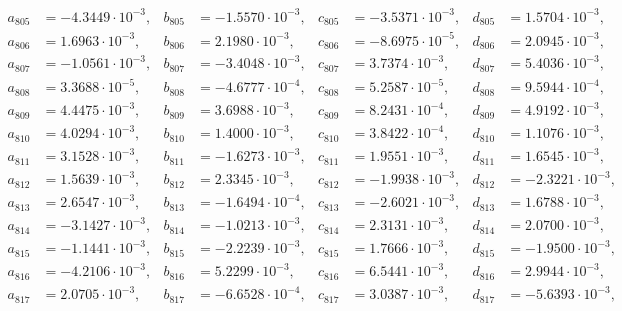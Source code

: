 \begin{align*}
  a_{ 805 } &= -4.3449 \cdot 10^{ -3 }, & b_{ 805 } &= -1.5570 \cdot 10^{ -3 }, & c_{ 805 } &= -3.5371 \cdot 10^{ -3 }, & d_{ 805 } &= 1.5704 \cdot 10^{ -3 }, \\ 
  a_{ 806 } &= 1.6963 \cdot 10^{ -3 }, & b_{ 806 } &= 2.1980 \cdot 10^{ -3 }, & c_{ 806 } &= -8.6975 \cdot 10^{ -5 }, & d_{ 806 } &= 2.0945 \cdot 10^{ -3 }, \\ 
  a_{ 807 } &= -1.0561 \cdot 10^{ -3 }, & b_{ 807 } &= -3.4048 \cdot 10^{ -3 }, & c_{ 807 } &= 3.7374 \cdot 10^{ -3 }, & d_{ 807 } &= 5.4036 \cdot 10^{ -3 }, \\ 
  a_{ 808 } &= 3.3688 \cdot 10^{ -5 }, & b_{ 808 } &= -4.6777 \cdot 10^{ -4 }, & c_{ 808 } &= 5.2587 \cdot 10^{ -5 }, & d_{ 808 } &= 9.5944 \cdot 10^{ -4 }, \\ 
  a_{ 809 } &= 4.4475 \cdot 10^{ -3 }, & b_{ 809 } &= 3.6988 \cdot 10^{ -3 }, & c_{ 809 } &= 8.2431 \cdot 10^{ -4 }, & d_{ 809 } &= 4.9192 \cdot 10^{ -3 }, \\ 
  a_{ 810 } &= 4.0294 \cdot 10^{ -3 }, & b_{ 810 } &= 1.4000 \cdot 10^{ -3 }, & c_{ 810 } &= 3.8422 \cdot 10^{ -4 }, & d_{ 810 } &= 1.1076 \cdot 10^{ -3 }, \\ 
  a_{ 811 } &= 3.1528 \cdot 10^{ -3 }, & b_{ 811 } &= -1.6273 \cdot 10^{ -3 }, & c_{ 811 } &= 1.9551 \cdot 10^{ -3 }, & d_{ 811 } &= 1.6545 \cdot 10^{ -3 }, \\ 
  a_{ 812 } &= 1.5639 \cdot 10^{ -3 }, & b_{ 812 } &= 2.3345 \cdot 10^{ -3 }, & c_{ 812 } &= -1.9938 \cdot 10^{ -3 }, & d_{ 812 } &= -2.3221 \cdot 10^{ -3 }, \\ 
  a_{ 813 } &= 2.6547 \cdot 10^{ -3 }, & b_{ 813 } &= -1.6494 \cdot 10^{ -4 }, & c_{ 813 } &= -2.6021 \cdot 10^{ -3 }, & d_{ 813 } &= 1.6788 \cdot 10^{ -3 }, \\ 
  a_{ 814 } &= -3.1427 \cdot 10^{ -3 }, & b_{ 814 } &= -1.0213 \cdot 10^{ -3 }, & c_{ 814 } &= 2.3131 \cdot 10^{ -3 }, & d_{ 814 } &= 2.0700 \cdot 10^{ -3 }, \\ 
  a_{ 815 } &= -1.1441 \cdot 10^{ -3 }, & b_{ 815 } &= -2.2239 \cdot 10^{ -3 }, & c_{ 815 } &= 1.7666 \cdot 10^{ -3 }, & d_{ 815 } &= -1.9500 \cdot 10^{ -3 }, \\ 
  a_{ 816 } &= -4.2106 \cdot 10^{ -3 }, & b_{ 816 } &= 5.2299 \cdot 10^{ -3 }, & c_{ 816 } &= 6.5441 \cdot 10^{ -3 }, & d_{ 816 } &= 2.9944 \cdot 10^{ -3 }, \\ 
  a_{ 817 } &= 2.0705 \cdot 10^{ -3 }, & b_{ 817 } &= -6.6528 \cdot 10^{ -4 }, & c_{ 817 } &= 3.0387 \cdot 10^{ -3 }, & d_{ 817 } &= -5.6393 \cdot 10^{ -3 }, \\ 

\end{align*}
